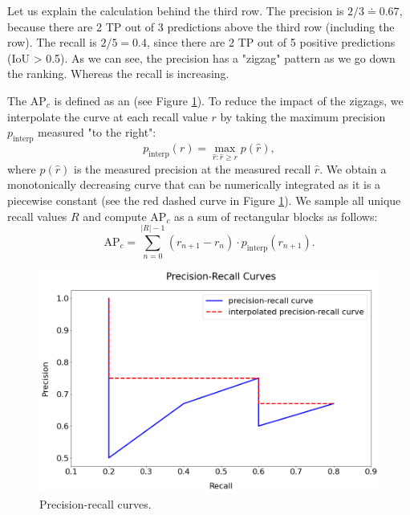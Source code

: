 Let us explain the calculation behind the third row. The precision is
$2/3 \doteq 0.67$, because there are 2 TP out of 3 predictions above the third
row (including the row). The recall is $2/5 = 0.4$, since there are 2 TP out of
5 positive predictions (IoU > 0.5). As we can see, the precision has a "zigzag"
pattern as we go down the ranking. Whereas the recall is increasing.

The AP$_c$ is defined as an  (see
Figure \ref{fig:precisionrecall}). To reduce the impact of the zigzags, we
interpolate the curve at each recall value $r$ by taking the maximum precision
$p_\text{interp}$ measured "to the right":
$$
    p_\text{interp}(r) = \max\limits_{\hat{r}:\hat{r} \geq r} p(\hat{r}),
$$
where $p(\hat{r})$ is the measured precision at the measured recall $\hat{r}$.
We obtain a monotonically decreasing curve that can be numerically integrated as
it is a piecewise constant (see the red dashed curve in Figure
\ref{fig:precisionrecall}). We sample all unique recall values $R$ and compute
AP$_c$ as a sum of rectangular blocks as follows:
$$
    \text{AP}_c = \sum\limits^{\lvert R\rvert - 1}_{n = 0} (r_{n+1} - r_n)
    \cdot p_\text{interp}(r_{n+1}).
$$

\begin{figure}[H]
    \centering
    \includegraphics[width=0.8\linewidth]{Sources/Figures/precisionrecall.png}
    \caption{Precision-recall curves.}
    \label{fig:precisionrecall}
\end{figure}

